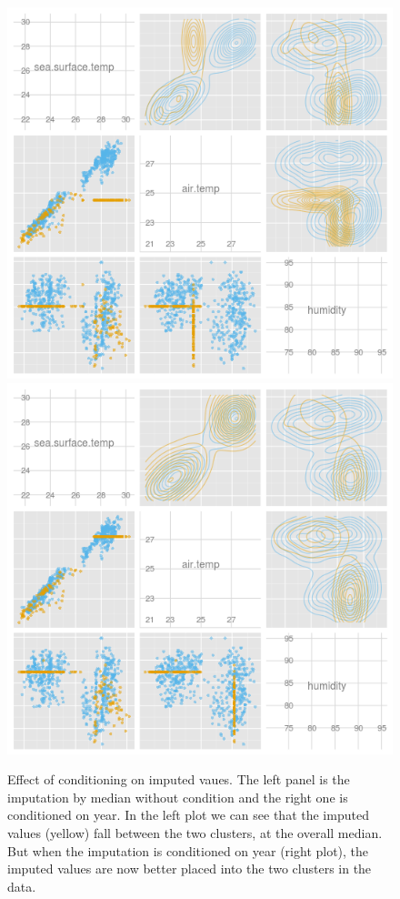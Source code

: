\documentclass[article]{jss}
\begin{document}
\begin{center}
\begin{figure}[h]
\begin{centering}
\includegraphics[width=.48\textwidth]{graph/fig4-1-median-uncondition}
\includegraphics[width=.48\textwidth]{graph/fig4-2-median-condition}
\par\end{centering}
\caption{Effect of conditioning on imputed vaues. The left panel is the imputation by median without condition and the right one is conditioned on year. In the left plot we can see that the imputed values (yellow) fall between the two clusters, at the overall median. But when the imputation is conditioned on year (right plot), the imputed values are now better placed into the two clusters in the data.}
\label{fig: condition}
\end{figure}
\par\end{center}
\end{document}
